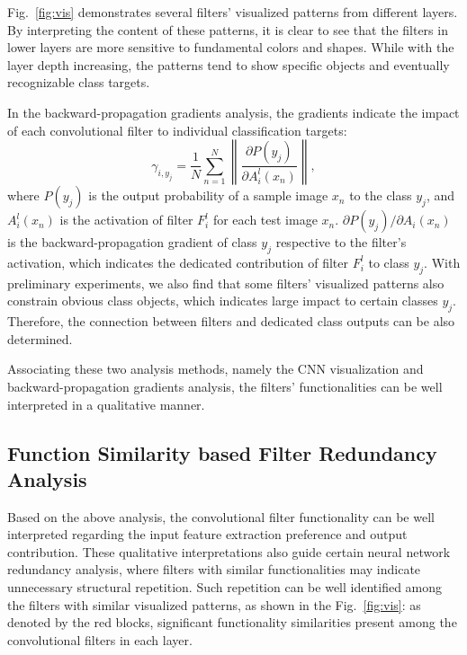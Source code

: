 \documentclass{article} %
\begin{document}
Fig.~\ref{fig:vis} demonstrates several filters' visualized patterns from different layers.
	By interpreting the content of these patterns, it is clear to see that the filters in lower layers are more sensitive to fundamental colors and shapes.
	While with the layer depth increasing, the patterns tend to show specific objects and eventually recognizable class targets.

In the backward-propagation gradients analysis,
	the gradients indicate the impact of each convolutional filter to individual classification targets:
\begin{equation}
	\gamma_{i,y_{j}} = \frac{1}{N}\sum_{n=1}^{N} \left \| \frac{\partial P(y_{j})}{\partial A_{i}^{l}(x_{n})} \right \|,
	\label{eq:contri}
\end{equation}
where $P(y_{j})$ is the output probability of a sample image $x_n$ to the class $y_{j}$, and $A_{i}^{l}(x_{n})$ is the activation of filter $F_i^l$ for each test image $x_n$.
	$\partial P(y_{j}) / \partial A_{i}(x_{n})$ is the backward-propagation gradient of class $y_j$ respective to the filter's activation, which indicates the dedicated contribution of filter $F_i^l$ to class $y_j$.
	With preliminary experiments, we also find that some filters' visualized patterns also constrain obvious class objects, which indicates large impact to certain classes $y_j$.
	Therefore, the connection between filters and dedicated class outputs can be also determined.

Associating these two analysis methods, namely the CNN visualization and backward-propagation gradients analysis, the filters' functionalities can be well interpreted in a qualitative manner.

\subsection{Function Similarity based Filter Redundancy Analysis}
Based on the above analysis, the convolutional filter functionality can be well interpreted regarding the input feature extraction preference and output contribution.
	These qualitative interpretations also guide certain neural network redundancy analysis, where filters with similar functionalities may indicate unnecessary structural repetition.
	Such repetition can be well identified among the filters with similar visualized patterns, as shown in the Fig.~\ref{fig:vis}:
	as denoted by the red blocks, significant functionality similarities present among the convolutional filters in each layer.
\end{document}
